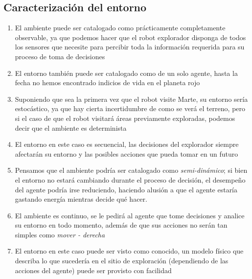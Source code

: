 \documentclass{article}
\begin{document}
        \subsection{Caracterización del entorno}
            \begin{enumerate}
                \item El ambiente puede ser catalogado como prácticamente completamente observable, ya que podemos hacer que el robot explorador disponga de todos los sensores que necesite para percibir toda la información requerida para su proceso de toma de decisiones
                \item El entorno también puede ser catalogado como de un solo agente, hasta la fecha no hemos encontrado indicios de vida en el planeta rojo
                \item Suponiendo que sea la primera vez que el robot visite Marte, su entorno sería estocástico, ya que hay cierta incertidumbre de como se verá el terreno, pero si el caso de que el robot visitará áreas previamente exploradas, podemos decir que el ambiente es determinista
                \item El entorno en este caso es secuencial, las decisiones del explorador siempre afectarán su entorno y las posibles acciones que pueda tomar en un futuro
                \item Pensamos que el ambiente podría ser catalogado como \emph{semi-dinámico}; si bien el entorno no estará cambiando durante el proceso de decisión, el desempeño del agente podría irse reduciendo, haciendo alusión a que el agente estaría gastando energía mientras decide qué hacer.
                \item El ambiente es continuo, se le pedirá al agente que tome decisiones y analice su entorno en todo momento, además de que sus acciones no serán tan simples como \emph{mover - derecha}
                \item El entorno en este caso puede ser visto como conocido, un modelo físico que describa lo que sucedería en el sitio de exploración (dependiendo de las acciones del agente) puede ser provisto con facilidad
            \end{enumerate}
\end{document}
